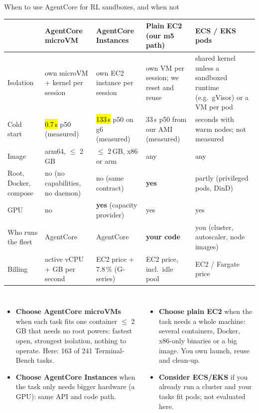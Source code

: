 \begin{frame}{When to use AgentCore for RL sandboxes, and when not}
\tiny\setlength{\tabcolsep}{3pt}
\begin{tabularx}{\textwidth}{@{}P{0.15\textwidth}YYYY@{}}
\toprule
& \textbf{\textcolor{cat2}{AgentCore microVM}} & \textbf{\textcolor{cat3}{AgentCore Instances}} & \textbf{\textcolor{cat1}{Plain EC2} (our m5 path)} & \textbf{ECS / EKS pods}\\
\midrule
Isolation & own microVM + kernel per session & own EC2 instance per session & own VM per session; we reset and reuse & shared kernel unless a sandboxed runtime (e.g.\ gVisor) or a VM per pod\\
Cold start & \hl{0.7\,s} p50 (measured) & \hl{133\,s} p50 on g6 (measured) & 33\,s p50 from our AMI (measured) & seconds with warm nodes; not measured\\
Image & arm64, $\le$ 2\,GB & $\le$ 2\,GB, x86 or arm & any & any\\
Root, Docker, compose & no (no capabilities, no daemon) & no (same contract) & \textbf{yes} & partly (privileged pods, DinD)\\
GPU & no & \textbf{yes} (capacity provider) & yes & yes\\
Who runs the fleet & AgentCore & AgentCore & \textbf{your code} & you (cluster, autoscaler, node images)\\
Billing & active vCPU + GB per second & EC2 price + 7.8\,\% (G-series) & EC2 price, incl.\ idle pool & EC2 / Fargate price\\
\bottomrule
\end{tabularx}
\par\vspace{2mm}
\begin{columns}[T]
\begin{itemize}\scriptsize\setlength{\itemsep}{0.6mm}
\item \textbf{Choose AgentCore microVMs} when each task fits one container $\le$ 2\,GB that needs no root powers: fastest open, strongest isolation, nothing to operate. Here: 163 of 241 Terminal-Bench tasks.
\item \textbf{Choose AgentCore Instances} when the task only needs bigger hardware (a GPU): same API and code path.
\end{itemize}
\begin{itemize}\scriptsize\setlength{\itemsep}{0.6mm}
\item \textbf{Choose plain EC2} when the task needs a whole machine: several containers, Docker, x86-only binaries or a big image. You own launch, reuse and clean-up.
\item \textbf{Consider ECS/EKS} if you already run a cluster and your tasks fit pods; not evaluated here.
\end{itemize}
\end{columns}
\end{frame}

